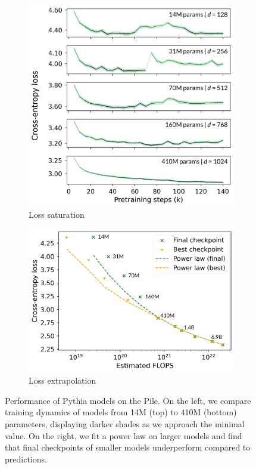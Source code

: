 \begin{figure}[ht]
\centering
    \begin{subfigure}{0.4\columnwidth}
         \includegraphics[width=\linewidth]{sources/part_1/softmax_bottleneck/imgs/loss_saturation_anno.pdf}
         \caption{Loss saturation}
         \label{fig:loss_sat}
    \end{subfigure}
    \begin{subfigure}{0.45\columnwidth}
         \includegraphics[width=\linewidth]{sources/part_1/softmax_bottleneck/imgs/scaling_laws_unfit_anno.pdf}
         \caption{Loss extrapolation}
         \label{fig:scaling_law}
    \end{subfigure}
    \caption{Performance of Pythia models on the Pile. On the left, we compare training dynamics of models from 14M (top) to 410M (bottom) parameters, displaying darker shades as we approach the minimal value. On the right, we fit a power law on larger models and find that final checkpoints of smaller models underperform compared to predictions.}
    \label{fig:saturation}
\end{figure}
